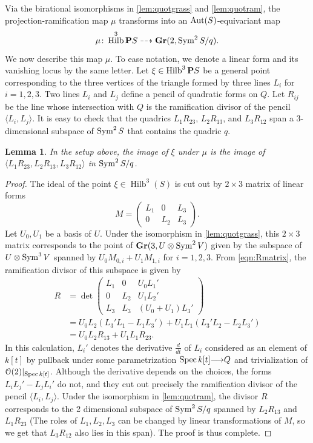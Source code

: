 \documentclass[11pt,reqno]{amsart}
\theoremstyle{plain}
\newtheorem{lemma}[theorem]{Lemma}
\theoremstyle{definition}
\theoremstyle{remark}
\numberwithin{equation}{section}
\renewcommand{\k}{k}
\DeclareMathOperator{\Hilb}{Hilb}
\renewcommand{\to}{{\longrightarrow}}
\numberwithin{equation}{section}
\renewcommand{\O}{\mathcal O}
\begin{document}
Via the birational isomorphisms in \autoref{lem:quotgrass} and \autoref{lem:quotram}, the projection-ramification map $\mu$ transforms into an $\operatorname{Aut}(S)$-equivariant map
\[
  \mu \from \Hilb^3\P S \dashrightarrow \Gr(2, \Sym^2S/q).
\]
We now describe this map $\mu$.
To ease notation, we denote a linear form and its vanishing locus by the same letter.
Let $\xi \in \Hilb^3 \P S$ be a general point corresponding to the three vertices of the triangle formed by three lines $L_i$ for $i = 1, 2, 3$.
Two lines $L_i$ and $L_j$ define a pencil of quadratic forms on $Q$.
Let $R_{ij}$ be the line whose intersection with $Q$ is the ramification divisor of the pencil $\langle  L_i, L_j \rangle$.
It is easy to check that the quadrics $L_1 R_{23}$, $L_2 R_{13}$, and $L_3R_{12}$ span a 3-dimensional subspace of $\operatorname{Sym}^2 S$ that contains the quadric $q$.
\begin{lemma}\label{lem:mu}
  In the setup above, the image of $\xi$ under $\mu$ is the image of $\langle  L_1R_{23}, L_2R_{13},L_3R_{12} \rangle$ in $\operatorname{Sym}^2S/q$.
\end{lemma}
\begin{proof}
  The ideal of the point $\xi \in \Hilb^3(S)$ is cut out by $2 \times 3$ matrix of linear forms
  \[
    M =
    \begin{pmatrix}
      L_1 & 0 & L_3 \\
      0 & L_2 & L_3
    \end{pmatrix}.
  \]
  Let $U_0, U_1$ be a basis of $U$.
  Under the isomorphism in \autoref{lem:quotgrass}, this $2 \times 3$ matrix corresponds to the point of ${\bf Gr}(3, U \otimes \operatorname{Sym}^2 V)$ given by the subspace of $U \otimes \operatorname{Sym}^3 V$ spanned by $U_0 M_{0,i} + U_1 M_{1,i}$ for $i = 1, 2, 3$.
  From \eqref{eqn:Rmatrix}, the ramification divisor of this subspace is given by
  \begin{align*}
    R &= \det
    \begin{pmatrix}
      L_1 & 0 & U_0 L_1' \\
      0 & L_2 & U_1 L_2' \\
      L_3 & L_3 & (U_0+U_1)L_3'
    \end{pmatrix} \\
      &= U_0L_2(L_3'L_1 - L_1L_3') + U_1L_1(L_3'L_2-L_2L_3')\\
      &= U_0L_2R_{13} + U_1 L_1R_{23}.
  \end{align*}
  In this calculation, $L_i'$ denotes the derivative $\frac{d}{dt}$ of $L_i$ considered as an element of $\k[t]$ by pullback under some parametrization $\spec \k[t] \to Q$ and trivialization of $\O(2)|_{\spec \k[t]}$.
  Although the derivative depends on the choices, the forms $L_iL_j' - L_jL_i'$ do not, and they cut out precisely the ramification divisor of the pencil $\langle  L_i, L_j \rangle$.
  Under the isomorphism in \eqref{lem:quotram}, the divisor $R$ corresponds to the 2 dimensional subspace of $\operatorname{Sym}^2 S/q$ spanned by $L_2R_{13}$ and $L_1R_{23}$ (The roles of $L_1, L_2, L_3$ can be changed by linear transformations of $M$, so we get that $L_3R_{12}$ also lies in this span).
  The proof is thus complete.
\end{proof}
\end{document}

